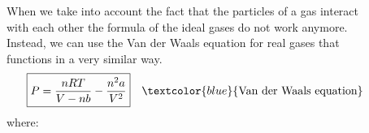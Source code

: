 \documentclass[main.tex]{subfiles}
\begin{document}
\begin{description}
\item[] 
When we take into account the fact that the particles of a gas interact with each other the formula of the ideal gases do not work anymore. Instead, we can use the Van der Waals equation for real gases that functions in a very similar way.
\begin{equation*}\begin{split}
\boxed{  P=\frac{nRT}{V-nb}-\frac{n^2a}{V^2}} \quad \textcolor{blue}{\text{Van der Waals equation}}
\end{split}\end{equation*}
where:



\end{description}
\end{document}
